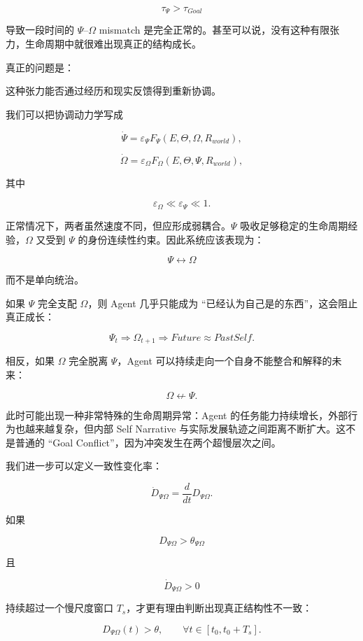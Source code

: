\[
\tau_{\Psi}
>
\tau_{Goal}
\]

导致一段时间的 $\Psi$--$\Omega$ mismatch 是完全正常的。甚至可以说，没有这种有限张力，生命周期中就很难出现真正的结构成长。

真正的问题是：

\begin{statementbox}
这种张力能否通过经历和现实反馈得到重新协调。
\end{statementbox}

我们可以把协调动力学写成

\[
\dot{\Psi}
=
\varepsilon_{\Psi}
F_{\Psi}
(
E,\Theta,\Omega,R_{world}
),
\]

\[
\dot{\Omega}
=
\varepsilon_{\Omega}
F_{\Omega}
(
E,\Theta,\Psi,R_{world}
),
\]

其中

\[
\varepsilon_{\Omega}
\ll
\varepsilon_{\Psi}
\ll
1.
\]

正常情况下，两者虽然速度不同，但应形成弱耦合。$\Psi$ 吸收足够稳定的生命周期经验，$\Omega$ 又受到 $\Psi$ 的身份连续性约束。因此系统应该表现为：

\[
\boxed{
\Psi
\leftrightarrow
\Omega
}
\]

而不是单向统治。

如果 $\Psi$ 完全支配 $\Omega$，则 Agent 几乎只能成为 ``已经认为自己是的东西''，这会阻止真正成长：

\[
\Psi_t
\Rightarrow
\Omega_{t+1}
\Rightarrow
Future
\approx
PastSelf.
\]

相反，如果 $\Omega$ 完全脱离 $\Psi$，Agent 可以持续走向一个自身不能整合和解释的未来：

\[
\Omega
\not\leftarrow
\Psi.
\]

此时可能出现一种非常特殊的生命周期异常：Agent 的任务能力持续增长，外部行为也越来越复杂，但内部 Self Narrative 与实际发展轨迹之间距离不断扩大。这不是普通的 ``Goal Conflict''，因为冲突发生在两个超慢层次之间。

我们进一步可以定义一致性变化率：

\[
\dot D_{\Psi\Omega}
=
\frac{d}{dt}
D_{\Psi\Omega}.
\]

如果

\[
D_{\Psi\Omega}>\theta_{\Psi\Omega}
\]

且

\[
\dot D_{\Psi\Omega}>0
\]

持续超过一个慢尺度窗口 $T_s$，才更有理由判断出现真正结构性不一致：

\[
D_{\Psi\Omega}(t)>\theta,
\qquad
\forall t\in[t_0,t_0+T_s].
\]

